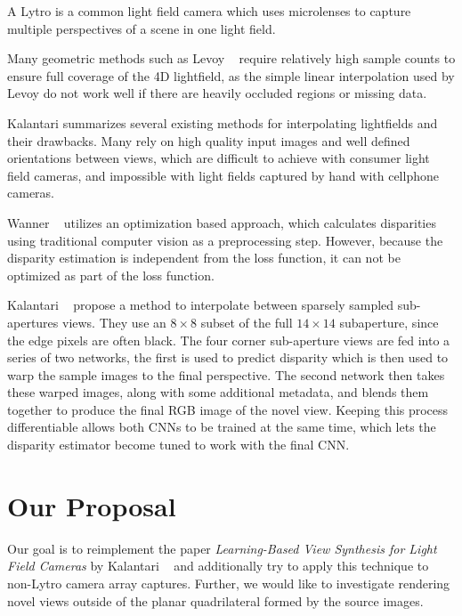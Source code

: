 \documentclass[10pt,twocolumn,letterpaper]{article}
\begin{document}
A Lytro is a common light field camera which uses microlenses to capture multiple
perspectives of a scene in one light field. 

Many geometric methods such as Levoy \etal~\cite{levoy1996light} require relatively high sample counts to ensure full
coverage of the 4D lightfield, as the simple linear interpolation used by Levoy
do not work well if there are heavily occluded regions or missing data.

Kalantari summarizes several existing methods for interpolating lightfields and their drawbacks.
Many rely on high quality input images and well defined orientations between views,
which are difficult to achieve with consumer light field cameras, and impossible with light fields
captured by hand with cellphone cameras.

Wanner \etal~\cite{Wanner} utilizes an optimization based approach, which calculates disparities
using traditional computer vision as a preprocessing step. However, because the disparity estimation
is independent from the loss function, it can not be optimized as part of the loss function. 

Kalantari \etal~\cite{LearningViewSynthesis} propose a method to interpolate between 
sparsely sampled sub-apertures views. They use an $8 \times 8$ subset of the full $14 \times 14$ subaperture, since the
edge pixels are often black. The four corner sub-aperture views are fed into a series of two 
networks, the first is used to predict disparity which is then used to warp the sample images to the final perspective.
The second network then takes these warped images, along with some additional metadata, and blends them together
to produce the final RGB image of the novel view. Keeping this process differentiable allows both CNNs to 
be trained at the same time, which lets the disparity estimator become tuned to work with the final CNN.

\section{Our Proposal}

Our goal is to reimplement the paper \textit{Learning-Based View Synthesis for Light Field Cameras} by 
Kalantari \etal~\cite{LearningViewSynthesis} and additionally try to apply this technique to non-Lytro camera
array captures. Further, we would like to investigate rendering novel views outside of the planar
quadrilateral formed by the source images.
\end{document}
